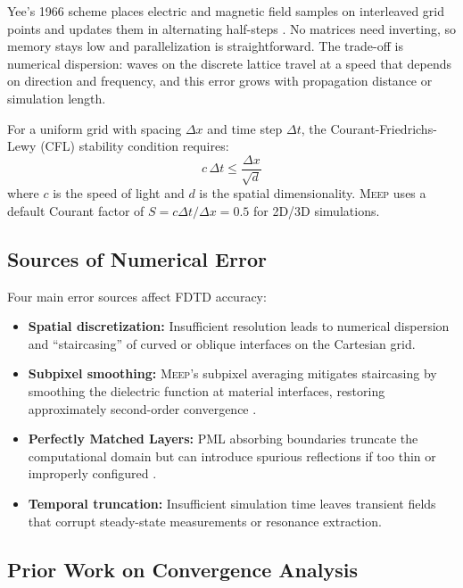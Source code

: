 \documentclass[12pt, a4paper]{article}
\newcommand{\meep}{\textsc{Meep}}
\newcommand{\fdtd}{\textsc{FDTD}}
\newcommand{\pml}{\textsc{PML}}
\begin{document}
Yee's 1966 scheme places electric and magnetic field samples on interleaved grid points and updates them in alternating half-steps \citep{Yee1966}. No matrices need inverting, so memory stays low and parallelization is straightforward. The trade-off is numerical dispersion: waves on the discrete lattice travel at a speed that depends on direction and frequency, and this error grows with propagation distance or simulation length.

For a uniform grid with spacing $\Delta x$ and time step $\Delta t$, the Courant-Friedrichs-Lewy (CFL) stability condition requires:
\begin{equation}
    c \, \Delta t \leq \frac{\Delta x}{\sqrt{d}}
\end{equation}
where $c$ is the speed of light and $d$ is the spatial dimensionality. \meep{} uses a default Courant factor of $S = c\Delta t / \Delta x = 0.5$ for 2D/3D simulations.

\subsection{Sources of Numerical Error}

Four main error sources affect \fdtd{} accuracy:

\begin{itemize}
    \item \textbf{Spatial discretization:} Insufficient resolution leads to numerical dispersion and ``staircasing'' of curved or oblique interfaces on the Cartesian grid.
    \item \textbf{Subpixel smoothing:} \meep{}'s subpixel averaging mitigates staircasing by smoothing the dielectric function at material interfaces, restoring approximately second-order convergence \citep{Farjadpour2006, Oskooi2009}.
    \item \textbf{Perfectly Matched Layers:} \pml{} absorbing boundaries truncate the computational domain but can introduce spurious reflections if too thin or improperly configured \citep{Berenger1994, MeepPML2024}.
    \item \textbf{Temporal truncation:} Insufficient simulation time leaves transient fields that corrupt steady-state measurements or resonance extraction.
\end{itemize}

\subsection{Prior Work on Convergence Analysis}
\end{document}
